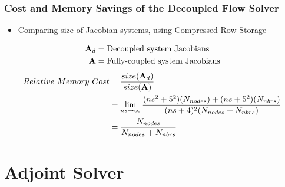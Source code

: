 \documentclass{beamer}
\begin{document}
\begin{frame}
  \frametitle{Cost and Memory Savings of the Decoupled Flow Solver}
  \begin{itemize}
    \item Comparing size of Jacobian systems, using Compressed Row Storage
  \end{itemize}
  \begin{align*}
    \mathbf A_d &= \text{Decoupled system Jacobians} \\
    \mathbf A &= \text{Fully-coupled system Jacobians}
  \end{align*}
  \[
  \begin{split} Relative\ Memory\ Cost &=
    \frac{size(\mathbf A_d)}{size(\mathbf A)} \\ &= \lim_{ns\to\infty}
    \frac{(ns^2+5^2)(N_{nodes})+(ns+5^2)(N_{nbrs})}{(ns+4)^2(N_{nodes}+N_{nbrs})} \\
    &= \frac{N_{nodes}}{N_{nodes} + N_{nbrs}}
  \end{split}
  \]
\end{frame}


\section{Adjoint Solver}
\end{document}
